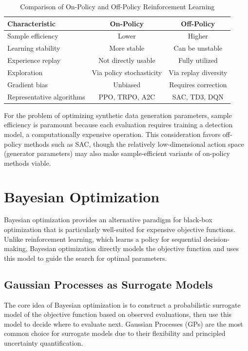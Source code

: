 \begin{table}[htbp]
\centering
\caption{Comparison of On-Policy and Off-Policy Reinforcement Learning}
\label{tab:on_off_policy}
\begin{tabular}{lcc}
\toprule
\textbf{Characteristic} & \textbf{On-Policy} & \textbf{Off-Policy} \\
\midrule
Sample efficiency & Lower & Higher \\
Learning stability & More stable & Can be unstable \\
Experience replay & Not directly usable & Fully utilized \\
Exploration & Via policy stochasticity & Via replay diversity \\
Gradient bias & Unbiased & Requires correction \\
Representative algorithms & PPO, TRPO, A2C & SAC, TD3, DQN \\
\bottomrule
\end{tabular}
\end{table}

For the problem of optimizing synthetic data generation parameters, sample efficiency is paramount because each evaluation requires training a detection model, a computationally expensive operation. This consideration favors off-policy methods such as SAC, though the relatively low-dimensional action space (generator parameters) may also make sample-efficient variants of on-policy methods viable.

\section{Bayesian Optimization}
\label{sec:bayesian_optimization}

Bayesian optimization provides an alternative paradigm for black-box optimization that is particularly well-suited for expensive objective functions. Unlike reinforcement learning, which learns a policy for sequential decision-making, Bayesian optimization directly models the objective function and uses this model to guide the search for optimal parameters.

\subsection{Gaussian Processes as Surrogate Models}
\label{subsec:gaussian_processes}

The core idea of Bayesian optimization is to construct a probabilistic surrogate model of the objective function based on observed evaluations, then use this model to decide where to evaluate next. Gaussian Processes (GPs) are the most common choice for surrogate models due to their flexibility and principled uncertainty quantification.

